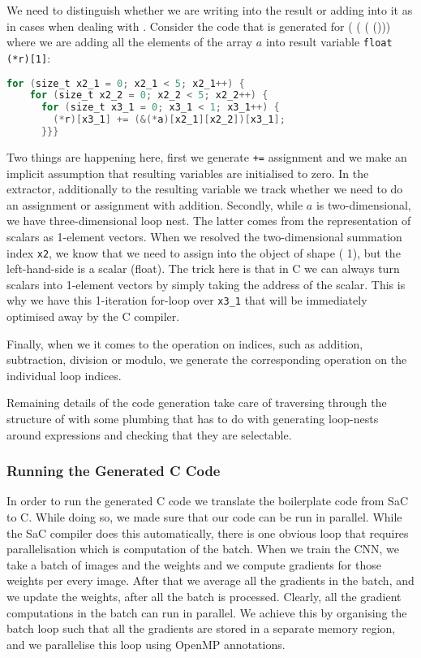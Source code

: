We need to distinguish whether we are writing into the result or adding
into it as in cases when dealing with .  Consider the code that
is generated for ( ( ( ())) where
we are adding all the elements of the array $a$ into result variable
\texttt{float (*r)[1]}:
\begin{lstlisting}[language=C]
  for (size_t x2_1 = 0; x2_1 < 5; x2_1++) {
    for (size_t x2_2 = 0; x2_2 < 5; x2_2++) {
      for (size_t x3_1 = 0; x3_1 < 1; x3_1++) { 
        (*r)[x3_1] += (&(*a)[x2_1][x2_2])[x3_1];
      }}}
\end{lstlisting}
Two things are happening here, first we generate \texttt{+=} assignment
and we make an implicit assumption that resulting variables are initialised
to zero.  In the extractor, additionally to the resulting variable we
track whether we need to do an assignment or assignment with addition.
Secondly, while $a$ is two-dimensional, we have three-dimensional loop
nest.  The latter comes from the representation of scalars as 1-element
vectors.  When we resolved the two-dimensional summation index \texttt{x2},
we know that we need to assign into the object of shape ( 1), but
the left-hand-side is a scalar (float).  The trick here is that in C we
can always turn scalars into 1-element vectors by simply taking the address
of the scalar.  This is why we have this 1-iteration for-loop over
\texttt{x3\_1} that will be immediately optimised away by the C compiler.

Finally, when we it comes to the operation on indices, such as addition,
subtraction, division or modulo, we generate the corresponding operation
on the individual loop indices.

Remaining details of the code generation take care of traversing through
the structure of  with some plumbing that has to do with generating
loop-nests around expressions and checking that they are selectable.

\subsubsection{Running the Generated C Code}
In order to run the generated C code we translate the boilerplate code
from SaC to C.  While doing so, we made sure that our code can be run
in parallel.  While the  SaC compiler does this automatically, there is one
obvious loop that requires parallelisation which is computation of
the batch.  When we train the CNN, we take a batch of images and the
weights and we compute gradients for those weights per every image.
After that we average all the gradients in the batch, and we update
the weights, after all the batch is processed.  Clearly, all the
gradient computations in the batch can run in parallel.  We achieve
this by organising the batch loop such that all the gradients are
stored in a separate memory region, and we parallelise this loop
using OpenMP annotations.

